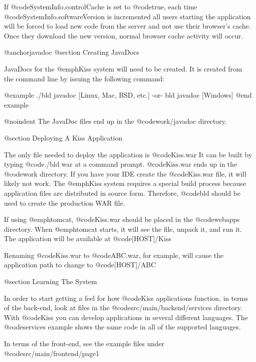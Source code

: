 If @code{SystemInfo.controlCache} is set to @code{true}, each time @code{SystemInfo.softwareVersion}
is incremented all users starting the application will be forced to
load new code from the server and not use their browser's cache.  Once
they download the new version, normal browser cache activity will
occur.


@anchor{javadoc} @section Creating JavaDocs

JavaDocs for the @emph{Kiss} system will need to be created.  It is
created from the command line by issuing the following command:

@example
./bld javadoc              [Linux, Mac, BSD, etc.]
    -or-
bld javadoc                [Windows]
@end example

@noindent
The JavaDoc files end up in the @code{work/javadoc} directory.


@section Deploying A Kiss Application

The only file needed to deploy the application is @code{Kiss.war} It
can be built by typing @code{./bld war} at a command prompt.
@code{Kiss.war} ends up in the @code{work} directory.  If you
have your IDE create the @code{Kiss.war} file, it will likely not
work.  The @emph{Kiss} system requires a special build process because
application files are distributed in source form.  Therefore, @code{bld}
should be used to create the production WAR file.

If using @emph{tomcat}, @code{Kiss.war} should be placed in the
@code{webapps} directory.  When @emph{tomcat} starts, it will see the
file, unpack it, and run it.  The application will be available at
@code{[HOST]/Kiss}

Renaming @code{Kiss.war} to @code{ABC.war}, for example, will cause
the application path to change to @code{[HOST]/ABC}

@section Learning The System

In order to start getting a feel for how @code{Kiss} applications
function, in terms of the back-end, look at files in the
@code{src/main/backend/services} directory.  With @code{Kiss} you can
develop applications in several different languages.  The @code{services}
example shows the same code in all of the supported languages.

In terms of the front-end, see the example files under @code{src/main/frontend/page1}
